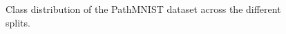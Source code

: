 \begin{figure}[ht]
    \centering
    
    \caption{Class distribution of the PathMNIST dataset across the different splits.}
    \label{fig:pathmnist-class-distribution}
\end{figure}
